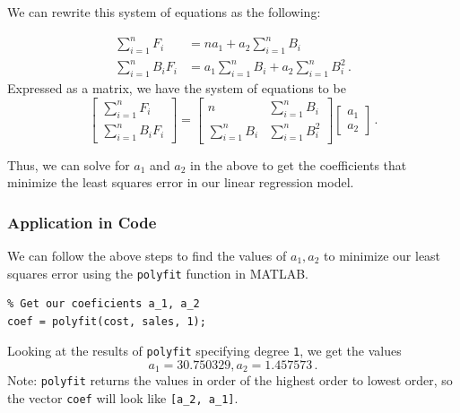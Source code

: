 \documentclass[11pt]{article}
\begin{document}
We can rewrite this system of equations as the following:

\begin{align*}
    \sum_{i=1}^{n}F_i & = n a_1 + a_2 \sum_{i=1}^{n}B_i \\ %
    \sum_{i=1}^{n}B_i F_i & = a_1 \sum_{i=1}^{n} B_i + a_2 \sum_{i=1}^{n} B_i^2 \, .
\end{align*}
Expressed as a matrix, we have the system of equations to be
\label{one-variable-error-matrix-1}
\begin{equation*}
    \begin{bmatrix}
        \sum_{i=1}^{n}F_i \\
        \sum_{i=1}^{n}B_i F_i
    \end{bmatrix}
    =
    \begin{bmatrix}
        n & \sum_{i=1}^{n} B_i \\
        \sum_{i=1}^{n} B_i & \sum_{i=1}^{n} B_i^2
    \end{bmatrix} 
    \begin{bmatrix}
        a_1 \\
        a_2
    \end{bmatrix} \, .
\end{equation*}

Thus, we can solve for $a_1$ and $a_2$ in the above to get the coefficients that minimize the least squares error in our linear regression model. %

\subsubsection{Application in Code}
We can follow the above steps to find the values of $a_1, a_2$ to minimize our least squares error using the \texttt{polyfit} function in MATLAB.
\label{polyfit-degree-1}
\begin{lstlisting}
% Get our coeficients a_1, a_2
coef = polyfit(cost, sales, 1); 
\end{lstlisting}
Looking at the results of \texttt{polyfit} specifying degree \texttt{1}, we get the values
\[ a_1 = 30.750329, a_2 = 1.457573 \, .\]
Note: \texttt{polyfit} returns the values in order of the highest order to lowest order, so the vector \texttt{coef} will look like \texttt{[a\_2, a\_1]}. 
\\
\end{document}
